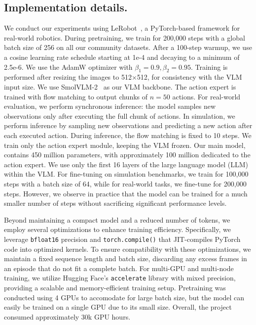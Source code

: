 \subsection{Implementation details.}

We conduct our experiments using LeRobot~\citep{cadene2024lerobot}, a PyTorch-based framework for real-world robotics. 
During pretraining, we train for 200,000 steps with a global batch size of 256 on all our community datasets. 
After a 100-step warmup, we use a cosine learning rate schedule starting at 1e-4 and decaying to a minimum of 2.5e-6. We use the AdamW optimizer with $\beta_1=0.9, \beta_2=0.95$.
Training is performed after resizing the images to 512×512, for consistency with the VLM input size. 
We use SmolVLM-2~\citep{marafioti2025smolvlm} as our VLM backbone. 
The action expert is trained with flow matching to output chunks of \( n = 50 \) actions. For real-world evaluation, we perform synchronous inference: the model samples new observations only after executing the full chunk of actions. In simulation, we perform inference by sampling new observations and predicting a new action after each executed action. During inference, the flow matching is fixed to 10 steps. 
We train only the action expert module, keeping the VLM frozen. 
Our main model, contains 450 million parameters, with approximately 100 million dedicated to the action expert. 
We use only the first 16 layers of the large language model (LLM) within the VLM. For fine-tuning on simulation benchmarks, we train for 100,000 steps with a batch size of 64, while for real-world tasks, we fine-tune for 200,000 steps. 
However, we observe in practice that the model can be trained for a much smaller number of steps without sacrificing significant performance levels.

Beyond maintaining a compact model and a reduced number of tokens, we employ several optimizations to enhance training efficiency. 
Specifically, we leverage \texttt{bfloat16} precision and \texttt{torch.compile()} \citep{paszke2019pytorch} that JIT-compiles PyTorch code into optimized kernels. 
To ensure compatibility with these optimizations, we maintain a fixed sequence length and batch size, discarding any excess frames in an episode that do not fit a complete batch. 
For multi-GPU and multi-node training, we utilize Hugging Face's \texttt{accelerate} \citep{accelerate} library with mixed precision, providing a scalable and memory-efficient training setup. 
Pretraining was conducted using 4 GPUs to accomodate for large batch size, but the model can easily be trained on a single GPU due to its small size. Overall, the project consumed approximately 30k GPU hours.

